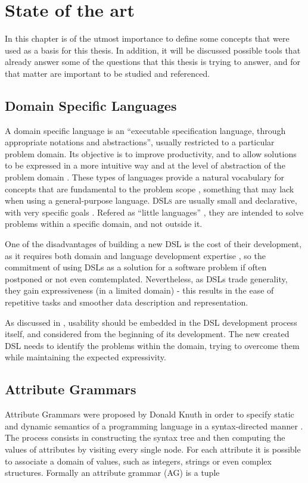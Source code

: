 \chapter{State of the art} \label{state_of_the_art}

In this chapter is of the utmost importance to define some concepts that were used as a basis for this thesis. 
In addition, it will be discussed possible tools that already answer some of the questions that this thesis is trying to answer, and for that matter are important to be studied and referenced.
	
\section{Domain Specific Languages}
A domain specific language is an ``executable specification language, through appropriate notations and abstractions'', usually restricted to a particular problem domain. 
Its objective is to improve productivity, and to allow solutions to be expressed in a more intuitive way and at the level of abstraction of the problem domain \cite{van_2000}.
These types of languages provide a natural vocabulary for concepts that are fundamental to the problem scope \cite{bruce_1997}, something that may lack when using a general-purpose language. 
\textsc{DSLs} are usually small and declarative, with very specific goals \cite{van_2000}.
Refered as ``little languages'' \cite{bentley_1986}, they are intended to solve problems within a specific domain, and not outside it.

One of the disadvantages of building a new \textsc{DSL} is the cost of their development, as it requires both domain and language development expertise \cite{kosar_2008},
so the commitment of using \textsc{DSL}s as a solution for a software problem if often postponed or not even comtemplated.
Nevertheless, as \textsc{DSL}s trade generality, they gain expressiveness (in a limited domain) - this results in the ease of repetitive tasks and smoother data
description \cite{mernik_2005} and representation.

As discussed in \cite{barisic_2012}, usability should be embedded in the \textsc{DSL} development process itself, and considered from the beginning of its development.
The new created \textsc{DSL} needs to identify the problems within the domain, trying to overcome them while maintaining the expected expressivity.


\section{Attribute Grammars}
Attribute Grammars were proposed by Donald Knuth in order to specify static and dynamic semantics of a programming language in a syntax-directed manner \cite{thirunarayan_2009}. 
The process consists in constructing the syntax tree and then computing the values of attributes by visiting every single node. 
For each attribute it is possible to associate a domain of values, such as integers, strings or even complex structures. 
Formally an attribute grammar (AG) is a tuple \cite{pereira_2016}

